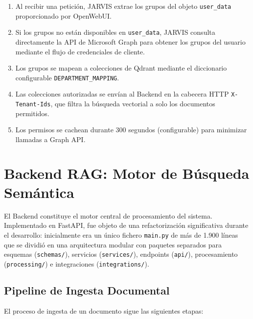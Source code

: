 \begin{enumerate}
    \item Al recibir una petición, JARVIS extrae los grupos del objeto \texttt{user\_data} proporcionado por OpenWebUI.
    \item Si los grupos no están disponibles en \texttt{user\_data}, JARVIS consulta directamente la API de Microsoft Graph para obtener los grupos del usuario mediante el flujo de credenciales de cliente.
    \item Los grupos se mapean a colecciones de Qdrant mediante el diccionario configurable \texttt{DEPARTMENT\_MAPPING}.
    \item Las colecciones autorizadas se envían al Backend en la cabecera HTTP \texttt{X-Tenant-Ids}, que filtra la búsqueda vectorial a solo los documentos permitidos.
    \item Los permisos se cachean durante 300 segundos (configurable) para minimizar llamadas a Graph API.
\end{enumerate}

\section{Backend RAG: Motor de Búsqueda Semántica}
\label{sec:backend-rag}

El Backend constituye el motor central de procesamiento del sistema. Implementado en FastAPI, fue objeto de una refactorización significativa durante el desarrollo: inicialmente era un único fichero \texttt{main.py} de más de 1.900 líneas que se dividió en una arquitectura modular con paquetes separados para esquemas (\texttt{schemas/}), servicios (\texttt{services/}), endpoints (\texttt{api/}), procesamiento (\texttt{processing/}) e integraciones (\texttt{integrations/}).

\subsection{Pipeline de Ingesta Documental}

El proceso de ingesta de un documento sigue las siguientes etapas:

